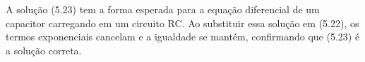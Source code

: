A solução (5.23) tem a forma esperada para a equação diferencial de um capacitor carregando em um circuito RC. Ao substituir essa solução em (5.22), os termos exponenciais cancelam e a igualdade se mantém, confirmando que (5.23) é a solução correta. 